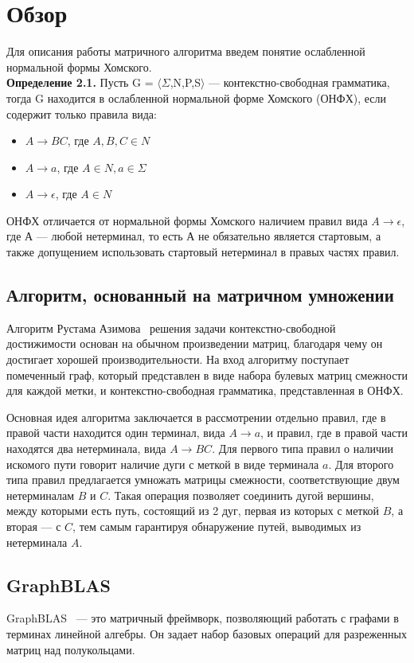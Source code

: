 \documentclass[14pt]{matmex-diploma-custom}
\begin{document}
\section{Обзор}
Для описания работы матричного алгоритма введем понятие ослабленной нормальной формы Хомского.\\
\textbf{Определение 2.1.}
Пусть G = $\langle\Sigma$,N,P,S$\rangle$ --- контекстно-свободная грамматика, тогда G находится в ослабленной нормальной форме Хомского (ОНФХ), если содержит только правила вида:
\begin{itemize}
    \item $A \rightarrow BC$, где $A, B, C \in N$
    \item $A \rightarrow a$, где $A \in N, a \in \Sigma$
    \item $A \rightarrow \epsilon$, где $A \in N$
\end{itemize}

ОНФХ отличается от нормальной формы Хомского наличием правил вида $A \rightarrow \epsilon$, где А --- любой нетерминал, то есть А не
обязательно является стартовым, а также допущением использовать
стартовый нетерминал в правых частях правил.\\

\subsection{Алгоритм, основанный на матричном умножении}
Алгоритм Рустама Азимова~\cite{azimov-algo} решения задачи контекстно-свободной достижимости основан на обычном произведении матриц, благодаря чему он достигает хорошей производительности. На вход алгоритму поступает помеченный граф, который представлен в виде набора булевых матриц смежности для каждой метки, и контекстно-свободная грамматика, представленная в ОНФХ.
 
Основная идея алгоритма заключается в рассмотрении отдельно
правил, где в правой части находится один терминал, вида $A \rightarrow a$, и
правил, где в правой части находятся два нетерминала, вида $A \rightarrow BC$.
Для первого типа правил о наличии искомого пути говорит наличие дуги с меткой в виде терминала $a$. Для второго типа правил предлагается
умножать матрицы смежности, соответствующие двум нетерминалам
$B$ и $C$. Такая операция позволяет соединить дугой вершины, между которыми есть путь, состоящий из 2 дуг, первая из которых с меткой $B$,
а вторая — с $C$, тем самым гарантируя обнаружение путей, выводимых
из нетерминала $A$.

\subsection{GraphBLAS}
GraphBLAS~\cite{Graphblas} --- это матричный фреймворк, позволяющий работать с графами в терминах линейной алгебры. Он задает набор базовых операций для разреженных матриц над полукольцами.
\end{document}
